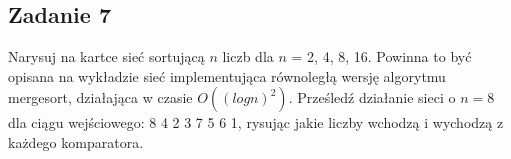 \documentclass{article}
\begin{document}
\subsection*{Zadanie 7}
Narysuj na kartce sieć sortującą $n$ liczb dla $n$ = 2, 4, 8, 16. Powinna to być opisana na
wykładzie sieć implementująca równoległą wersję algorytmu mergesort, działająca w
czasie $O((log n)^2)$. Prześledź działanie sieci o $n = 8$ dla ciągu wejściowego: 8 4 2 3 7 5 6
1, rysując jakie liczby wchodzą i wychodzą z każdego komparatora.
\end{document}
